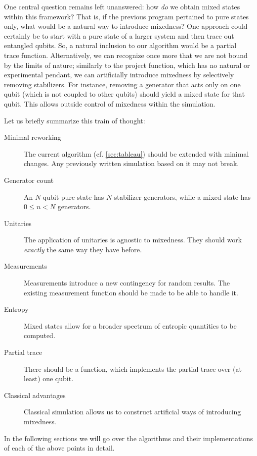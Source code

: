 One central question remains left unanswered: how \emph{do} we obtain mixed
states within this framework?  That is, if the previous program pertained to
pure states only, what would be a natural way to introduce mixedness?  One
approach could certainly be to start with a pure state of a larger system and
then trace out entangled qubits.  So, a natural inclusion to our algorithm
would be a partial trace function.  Alternatively, we can recognize once more
that we are not bound by the limits of nature; similarly to the project
function, which has no natural or experimental pendant, we can artificially
introduce mixedness by selectively removing stabilizers.
For instance, removing a generator that acts only on one qubit (which is not
coupled to other qubits) should yield a mixed state for that qubit. This allows
outside control of mixedness within the simulation.

Let us briefly summarize this train of thought:
\begin{description}
  \item[Minimal reworking] The current algorithm (cf. \cref{sec:tableau})
    should be extended with minimal changes. Any previously written simulation
    based on it may not break.
  \item[Generator count] An $N$-qubit pure state has $N$ stabilizer generators,
    while a mixed state has $0\leq n<N$ generators.
  \item[Unitaries] The application of unitaries is agnostic to mixedness. They
    should work \emph{exactly} the same way they have before.
  \item[Measurements] Measurements introduce a new contingency for random
    results. The existing measurement function should be made to be able to handle it.
  \item[Entropy] Mixed states allow for a broader spectrum of entropic
    quantities to be computed. %
  \item[Partial trace] There should be a function, which implements the partial trace over (at
    least) one qubit.
  \item[Classical advantages] Classical simulation allows us to construct artificial ways of
    introducing mixedness.
\end{description}
In the following sections we will go over the algorithms and their
implementations of each of the
above points in detail.

